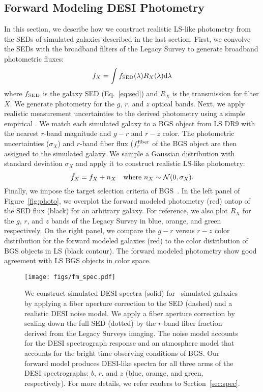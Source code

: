 \subsection{Forward Modeling DESI Photometry} \label{sec:photo} 
In this section, we describe how we construct realistic LS-like photometry
from the SEDs of simulated galaxies described in the last section.
First, we convolve the SEDs with the broadband filters of the Legacy Survey to
generate broadband photometric fluxes: 
\begin{equation} \label{eq:photo}
    f_X = \int f_{\rm SED}(\lambda) R_X(\lambda) {\rm d}\lambda
\end{equation}
where $f_{\rm SED}$ is the galaxy SED (Eq.~\ref{eq:sed}) and $R_X$ is the
transmission for filter $X$. 
We generate photometry for the $g$, $r$, and $z$ optical bands.
Next, we apply realistic measurement uncertainties to the derived photometry
using a simple empirical . 
We match each simulated galaxy to a BGS object from LS DR9 with the nearest $r$-band magnitude and
$g-r$ and $r-z$ color.
The photometric uncertainties ($\sigma_X$) and $r$-band fiber flux ($f_r^{\rm
fiber}$ of the BGS object are then assigned to the simulated galaxy. 
We sample a Gaussian distribution with standard deviation $\sigma_X$ and apply
it to construct realistic LS-like photometry: 
\begin{equation}
    \hat{f}_X = f_X + n_X  \quad {\rm where}~n_X \sim \mathcal{N}(0, \sigma_X).
\end{equation} 
Finally, we impose the target selection criteria of BGS~\citep[][Hahn~\etal~in
prep.]{ruiz-macias2021}.
In the left panel of Figure~\ref{fig:photo}, we overplot the forward
modeled photometry (red) ontop of the SED flux (black) for an arbitrary \lgal
galaxy. 
For reference, we also plot $R_X$ for the $g$, $r$, and $z$ bands of the Legacy
Survey in blue, orange, and green respectively. 
On the right panel, we compare the $g - r$ versus $r - z$ color distribution
for the forward modeled \lgal galaxies (red) to the color distribution of BGS
objects in LS (black contour). 
The forward modeled photometry show good agreement with LS BGS objects in
color space.

\begin{figure}
\begin{center}
\texttt{[image: figs/fm\_spec.pdf]} \label{fig:spec}
\caption{
    We construct simulated DESI spectra (solid) for \lgal~simulated galaxies by
    applying a fiber aperture correction to the SED (dashed) and a realistic
    DESI noise model. 
    We apply a fiber aperture correction by scaling down the full SED (dotted)
    by the $r$-band fiber fraction derived from the Legacy Surveys imaging. 
    The noise model accounts for the DESI spectrograph response and an
    atmosphere model that accounts for the bright time observing conditions of
    BGS.
    Our forward model produces DESI-like spectra for all three arms of the DESI
    spectrographs: $b$, $r$, and $z$ (blue, orange, and green, respectively). 
    For more details, we refer readers to Section~\ref{sec:spec}.
    }
\end{center}
\end{figure}

